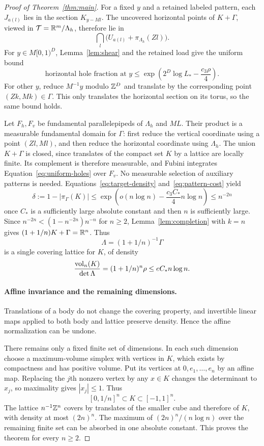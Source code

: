 \begin{proof}[Proof of Theorem~\ref{thm:main}]
For a fixed $y$ and a retained labeled pattern, each $J_{a(l)}$
lies in the section $K_{y-Ml}$. The uncovered horizontal points of
$K+\Gamma$, viewed in $\mathcal T=\mathbb R^m/\Lambda_h$, therefore lie in
\[
 \bigcap_l\bigl(U_{a(l)}+\pi_{\Lambda_h}(Zl)\bigr).
\]
For $y\in M[0,1)^D$, Lemma~\ref{lem:shear} and the retained load give
the uniform bound
\begin{equation}\label{eq:uniform-holes}
 \text{horizontal hole fraction at }y
 \le\exp\left(2^D\log L_*-\frac{c_3\rho}{4}\right).
\end{equation}
For other $y$, reduce $M^{-1}y$ modulo $\mathbb Z^D$ and translate by the
corresponding point $(Zk,Mk)\in\Gamma$. This only translates the
horizontal section on its torus, so the same bound holds.

Let $F_h,F_v$ be fundamental parallelepipeds of $\Lambda_h$ and
$ML$. Their product is a measurable fundamental domain for
$\Gamma$: first reduce the vertical coordinate using a point
$(Zl,Ml)$, and then reduce the horizontal coordinate using
$\Lambda_h$. The union $K+\Gamma$ is closed, since translates of
the compact set $K$ by a lattice are locally finite. Its complement
is therefore measurable, and Fubini integrates
Equation~\eqref{eq:uniform-holes} over $F_v$. No measurable selection
of auxiliary patterns is needed. Equations~\eqref{eq:target-density}
and~\eqref{eq:pattern-cost} yield
\[
 \delta:=1-|\pi_\Gamma(K)|
 \le\exp\left(o(n\log n)-\frac{c_3C_*}{4}n\log n\right)
 \le n^{-2n}
\]
once $C_*$ is a sufficiently large absolute constant and then $n$
is sufficiently large. Since $n^{-2n}<(1-n^{-2n})n^{-n}$ for
$n\ge2$, Lemma~\ref{lem:completion} with $k=n$ gives
$(1+1/n)K+\Gamma=\mathbb R^n$. Thus
\[
 \Lambda=(1+1/n)^{-1}\Gamma
\]
is a single covering lattice for $K$, of density
\[
 \frac{\operatorname{vol}_n(K)}{\det\Lambda}
 =(1+1/n)^n\rho\le eC_*n\log n.
\]

\paragraph{Affine invariance and the remaining dimensions.}
Translations of a body do not change the covering property, and
invertible linear maps applied to both body and lattice preserve
density. Hence the affine normalization can be undone.

There remains only a fixed finite set of dimensions. In each such
dimension choose a maximum-volume simplex with vertices in $K$,
which exists by compactness and has positive volume. Put its vertices
at $0,e_1,\ldots,e_n$ by an affine map. Replacing the $j$th nonzero
vertex by any $x\in K$ changes the determinant to $x_j$, so maximality
gives $|x_j|\le1$. Thus
\[
 [0,1/n]^n\subset K\subset[-1,1]^n.
\]
The lattice $n^{-1}\mathbb Z^n$ covers by translates of the smaller cube
and therefore of $K$, with density at most $(2n)^n$.
The maximum of $(2n)^n/(n\log n)$ over the remaining finite set
can be absorbed in one absolute constant. This proves the theorem
for every $n\ge2$.
\end{proof}
